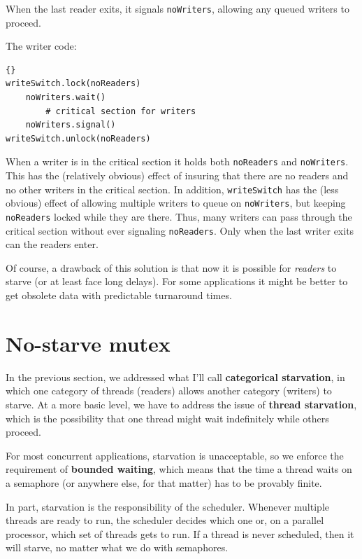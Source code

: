 \documentclass{book}
\begin{document}
When the last reader exits, it signals {\tt noWriters},
allowing any queued writers to proceed.

The writer code:

\begin{lstlisting}[title={Writer-priority writer solution}]{}
writeSwitch.lock(noReaders)
    noWriters.wait()
        # critical section for writers
    noWriters.signal()
writeSwitch.unlock(noReaders)
\end{lstlisting}

When a writer is in the critical section it holds both
    {\tt noReaders} and {\tt noWriters}.  This has the
(relatively obvious) effect of insuring that there are
no readers and no other writers in the critical section.
In addition, {\tt writeSwitch} has the (less obvious) effect of
allowing multiple writers to queue on {\tt noWriters},
but keeping {\tt noReaders} locked while they are
there.  Thus, many writers can pass through the critical
section without ever signaling
    {\tt noReaders}.  Only when the last writer exits can
the readers enter.

Of course, a drawback of this solution is that now it is
possible for {\em readers} to starve (or at least face long
delays).  For some applications it might be better to get
obsolete data with predictable turnaround times.




\section{No-starve mutex}
\label{props}

In the previous section, we addressed what I'll call
    {\bf categorical starvation}, in which one category of threads
(readers) allows another category (writers) to starve.
At a more basic level, we have to address the issue of
    {\bf thread starvation}, which is the possibility that one
thread might wait indefinitely while others proceed.

For most concurrent applications, starvation is unacceptable,
so we enforce the requirement of {\bf bounded waiting}, which
means that the time a thread waits on a semaphore (or anywhere
else, for that matter) has to be provably finite.

In part, starvation is the responsibility of the scheduler.
Whenever multiple threads are ready to run, the scheduler decides
which one or, on a parallel processor, which set of threads gets
to run.  If a thread is never scheduled, then it will starve,
no matter what we do with semaphores.
\end{document}
